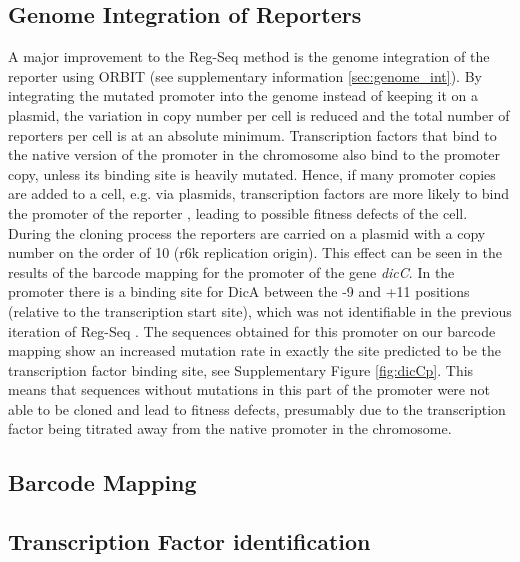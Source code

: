 \subsection{Genome Integration of Reporters}
A major improvement to the Reg-Seq method is the genome integration of the reporter using ORBIT (see supplementary information \ref{sec:genome_int}). By integrating the mutated promoter into the genome instead of keeping it on a plasmid, the variation in copy number per cell is reduced and the total number of reporters per cell is at an absolute minimum. Transcription factors that bind to the native version of the promoter in the chromosome also bind to the promoter copy, unless its binding site is heavily mutated. Hence, if many promoter copies are added to a cell, e.g. via plasmids, transcription factors are more likely to bind the promoter of the reporter \cite{brewster2014transcription}, leading to possible fitness defects of the cell. During the cloning process the reporters are carried on a plasmid with a copy number on the order of 10 (r6k replication origin). This effect can be seen in the results of the barcode mapping for the promoter of the gene \textit{dicC}. In the promoter there is a binding site for DicA between the -9 and +11 positions (relative to the transcription start site), which was not identifiable in the previous iteration of Reg-Seq \cite{ireland2020deciphering}. The sequences obtained for this promoter on our barcode mapping show an increased mutation rate in exactly the site predicted to be the transcription factor binding site, see Supplementary Figure \ref{fig:dicCp}. This means that sequences without mutations in this part of the promoter were not able to be cloned and lead to fitness defects, presumably due to the transcription factor being titrated away from the native promoter in the chromosome.

\subsection{Barcode Mapping}

\subsection{Transcription Factor identification}
